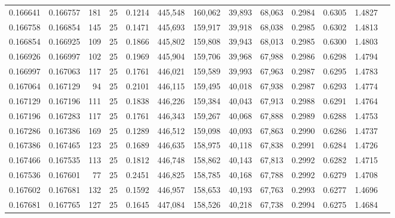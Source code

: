 \begin{tabular}{rrrrrrrrrrrrr}
0.166641 & 0.166757 &   181 &  25 &                                     0.1214 & 445,548 & 160,062 &  39,893 &  68,063 & 0.2984 & 0.6305 & 1.4827 \\
0.166758 & 0.166854 &   145 &  25 &                                     0.1471 & 445,693 & 159,917 &  39,918 &  68,038 & 0.2985 & 0.6302 & 1.4813 \\
0.166854 & 0.166925 &   109 &  25 &                                     0.1866 & 445,802 & 159,808 &  39,943 &  68,013 & 0.2985 & 0.6300 & 1.4803 \\
0.166926 & 0.166997 &   102 &  25 &                                     0.1969 & 445,904 & 159,706 &  39,968 &  67,988 & 0.2986 & 0.6298 & 1.4794 \\
0.166997 & 0.167063 &   117 &  25 &                                     0.1761 & 446,021 & 159,589 &  39,993 &  67,963 & 0.2987 & 0.6295 & 1.4783 \\
0.167064 & 0.167129 &    94 &  25 &                                     0.2101 & 446,115 & 159,495 &  40,018 &  67,938 & 0.2987 & 0.6293 & 1.4774 \\
0.167129 & 0.167196 &   111 &  25 &                                     0.1838 & 446,226 & 159,384 &  40,043 &  67,913 & 0.2988 & 0.6291 & 1.4764 \\
0.167196 & 0.167283 &   117 &  25 &                                     0.1761 & 446,343 & 159,267 &  40,068 &  67,888 & 0.2989 & 0.6288 & 1.4753 \\
0.167286 & 0.167386 &   169 &  25 &                                     0.1289 & 446,512 & 159,098 &  40,093 &  67,863 & 0.2990 & 0.6286 & 1.4737 \\
0.167386 & 0.167465 &   123 &  25 &                                     0.1689 & 446,635 & 158,975 &  40,118 &  67,838 & 0.2991 & 0.6284 & 1.4726 \\
0.167466 & 0.167535 &   113 &  25 &                                     0.1812 & 446,748 & 158,862 &  40,143 &  67,813 & 0.2992 & 0.6282 & 1.4715 \\
0.167536 & 0.167601 &    77 &  25 &                                     0.2451 & 446,825 & 158,785 &  40,168 &  67,788 & 0.2992 & 0.6279 & 1.4708 \\
0.167602 & 0.167681 &   132 &  25 &                                     0.1592 & 446,957 & 158,653 &  40,193 &  67,763 & 0.2993 & 0.6277 & 1.4696 \\
0.167681 & 0.167765 &   127 &  25 &                                     0.1645 & 447,084 & 158,526 &  40,218 &  67,738 & 0.2994 & 0.6275 & 1.4684 \\

\end{tabular}
